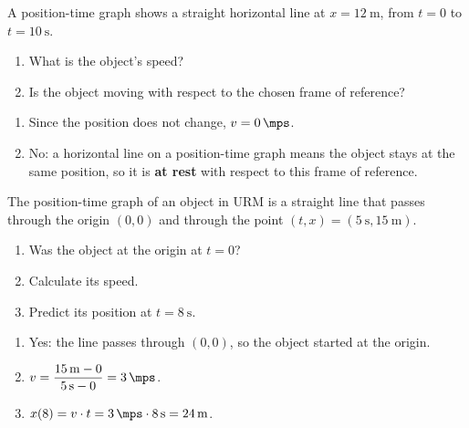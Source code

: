 \begin{exercise}
    A position-time graph shows a straight horizontal line at \(x = \qty{12}{\m}\), from \(t=0\) to \(t=\qty{10}{\s}\).
    \begin{enumerate}[label=\letraminuscula]
        \item What is the object's speed?
        \item Is the object moving with respect to the chosen frame of reference?
    \end{enumerate}
    \begin{solu}
        \begin{enumerate}[label=\alph*)]
            \item Since the position does not change, \(v = \qty{0}{\mps}\).
            \item No: a horizontal line on a position-time graph means the object stays at the same position, so it is \textbf{at rest} with respect to this frame of reference.
        \end{enumerate}
    \end{solu}
\end{exercise}

\begin{exercise}
    The position-time graph of an object in URM is a straight line that passes through the origin \((0,0)\) and through the point \((t,x) = (\qty{5}{\s}, \qty{15}{\m})\).
    \begin{enumerate}[label=\letraminuscula]
        \item Was the object at the origin at \(t=0\)?
        \item Calculate its speed.
        \item Predict its position at \(t=\qty{8}{\s}\).
    \end{enumerate}
    \begin{solu}
        \begin{enumerate}[label=\alph*)]
            \item Yes: the line passes through \((0,0)\), so the object started at the origin.
            \item \(v = \dfrac{\qty{15}{\m} - 0}{\qty{5}{\s} - 0} = \qty{3}{\mps}\).
            \item \(x(8) = v \cdot t = \qty{3}{\mps} \cdot \qty{8}{\s} = \qty{24}{\m}\).
        \end{enumerate}
    \end{solu}
\end{exercise}

